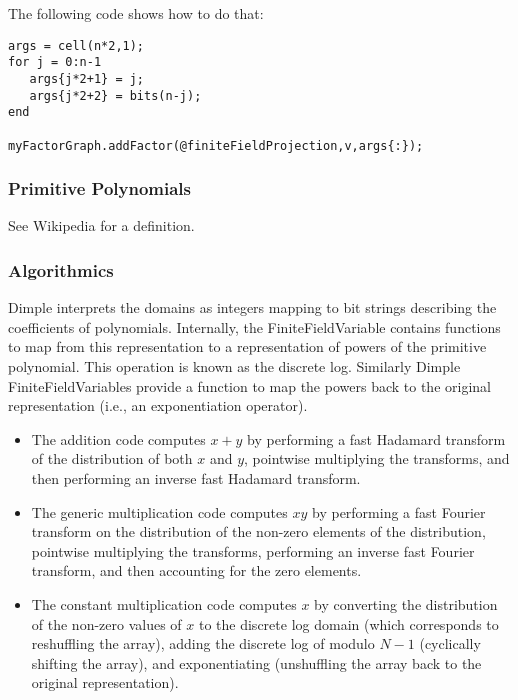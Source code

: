 The following code shows how to do that:

\begin{lstlisting}
args = cell(n*2,1);
for j = 0:n-1
   args{j*2+1} = j;
   args{j*2+2} = bits(n-j);
end

myFactorGraph.addFactor(@finiteFieldProjection,v,args{:});
\end{lstlisting}

\subsubsection{Primitive Polynomials}

See Wikipedia for a definition. 

\subsubsection{Algorithmics}


Dimple interprets the domains as integers mapping to bit strings describing the coefficients of polynomials. Internally, the FiniteFieldVariable contains functions to map from this representation to a representation of powers of the primitive polynomial. This operation is known as the discrete log. Similarly Dimple FiniteFieldVariables provide a function to map the powers back to the original representation (i.e., an exponentiation operator).

\begin{itemize}
\item The addition code computes $x+y$ by performing a fast Hadamard transform of the distribution of both $x$ and $y$, pointwise multiplying the transforms, and then performing an inverse fast Hadamard transform.
\item The generic multiplication code computes $xy$ by performing a fast Fourier transform on the distribution of the non-zero elements of the distribution, pointwise multiplying the transforms, performing an inverse fast Fourier transform, and then accounting for the zero elements.
\item The constant multiplication code computes $x$ by converting the distribution of the non-zero values of $x$ to the discrete log domain (which corresponds to reshuffling the array), adding the discrete log of   modulo $N-1$ (cyclically shifting the array), and exponentiating (unshuffling the array back to the original representation).  
\end{itemize}

